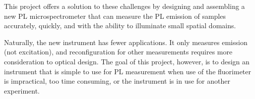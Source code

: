 This project offers a solution to these challenges by designing and assembling a new PL microspectrometer that can measure the PL emission of samples accurately, quickly, and with the ability to illuminate small spatial domains.

Naturally, the new instrument has fewer applications. It only measures emission (not excitation), and reconfiguration for other measurements requires more consideration to optical design. The goal of this project, however, is to design an instrument that is simple to use for PL measurement when use of the fluorimeter is impractical, too time consuming, or the instrument is in use for another experiment.
